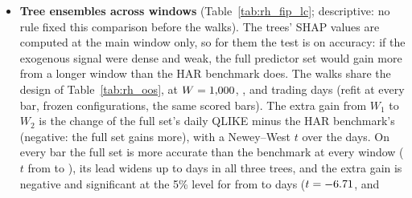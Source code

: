 \begin{itemize}
\begin{itemize}
    is also what a signal that changes over time would produce, since a longer window averages over more regimes.
    The test does not separate these readings; the paper relies instead on the feature-count ladder
    (Appendix~\ref{app:rh_fi_ladder}; by day type, Table~\ref{tab:rh_channels_sparse}) and the ridge--lasso
    comparison (Section~\ref{sec:rh_fi}).
  \end{itemize}
\item \textbf{Tree ensembles across windows} (Table~\ref{tab:rh_fip_lc}; descriptive: no rule fixed this comparison
  before the walks). The trees' SHAP values are computed at the main window only, so for them the test is on
  accuracy: if the exogenous signal were dense and weak, the full predictor set would gain more from a longer window
  than the HAR benchmark does. The walks share the design of Table~\ref{tab:rh_oos}, at $W = 1{,}000$, \rhlcWTwo,
  \rhlcWMain{} and \rhlcWLong{} trading days (refit at every bar, frozen configurations, the same \rhlcNBars{} scored
  bars). The extra gain from $W_1$ to $W_2$ is the change of the full set's daily QLIKE minus the HAR benchmark's
  (negative: the full set gains more), with a Newey--West $t$ over the \rhlcNDays{} days. On every bar the full set is
  more accurate than the benchmark at every window ($t$ from \rhlcGapTMinBar{} to \rhlcGapTMaxBar), its lead widens up
  to \rhlcWMain{} days in all three trees, and the extra gain is negative and significant at the 5\% level for
  \rhlcSigNegOneTwoBarWho{} from \rhlcWOne{} to \rhlcWTwo{} days ($t = -6.71$, \rhlcTXgbOneTwoBar{} and

\end{itemize}
